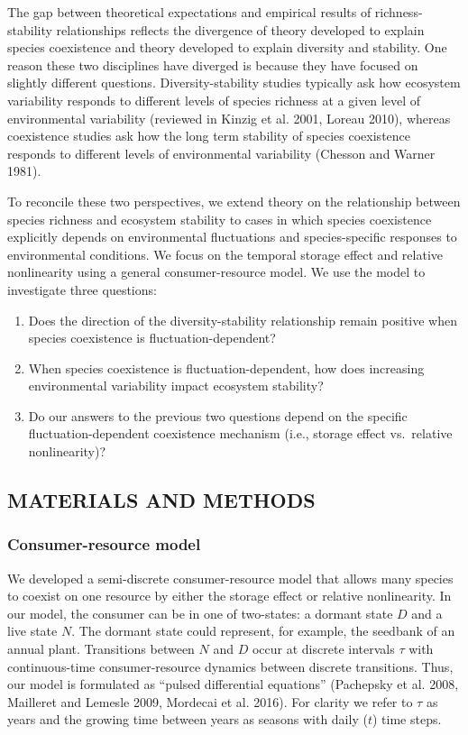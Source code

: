 \documentclass[12pt,]{article}
\begin{document}
The gap between theoretical expectations and empirical results of
richness-stability relationships reflects the divergence of theory
developed to explain species coexistence and theory developed to explain
diversity and stability. One reason these two disciplines have diverged
is because they have focused on slightly different questions.
Diversity-stability studies typically ask how ecosystem variability
responds to different levels of species richness at a given level of
environmental variability (reviewed in Kinzig et al. 2001, Loreau 2010),
whereas coexistence studies ask how the long term stability of species
coexistence responds to different levels of environmental variability
(Chesson and Warner 1981).

To reconcile these two perspectives, we extend theory on the
relationship between species richness and ecosystem stability to cases
in which species coexistence explicitly depends on environmental
fluctuations and species-specific responses to environmental conditions.
We focus on the temporal storage effect and relative nonlinearity using
a general consumer-resource model. We use the model to investigate three
questions:

\begin{enumerate}
\def\labelenumi{\arabic{enumi}.}
\item
  Does the direction of the diversity-stability relationship remain
  positive when species coexistence is fluctuation-dependent?
\item
  When species coexistence is fluctuation-dependent, how does increasing
  environmental variability impact ecosystem stability?
\item
  Do our answers to the previous two questions depend on the specific
  fluctuation-dependent coexistence mechanism (i.e., storage effect
  vs.~relative nonlinearity)?
\end{enumerate}

\subsection{MATERIALS AND METHODS}\label{materials-and-methods}

\subsubsection{Consumer-resource model}\label{consumer-resource-model}

We developed a semi-discrete consumer-resource model that allows many
species to coexist on one resource by either the storage effect or
relative nonlinearity. In our model, the consumer can be in one of
two-states: a dormant state \(D\) and a live state \(N\). The dormant
state could represent, for example, the seedbank of an annual plant.
Transitions between \(N\) and \(D\) occur at discrete intervals \(\tau\)
with continuous-time consumer-resource dynamics between discrete
transitions. Thus, our model is formulated as ``pulsed differential
equations'' (Pachepsky et al. 2008, Mailleret and Lemesle 2009, Mordecai
et al. 2016). For clarity we refer to \(\tau\) as years and the growing
time between years as seasons with daily (\(t\)) time steps.
\end{document}
